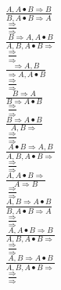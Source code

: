 \documentclass[11pt]{article}
\begin{document}
\begin{center}
\bigskip
\\$\frac{A, A\bullet B\Rightarrow B}{B, A\bullet B\Rightarrow A}$
\bigskip
\\$\frac{\Rightarrow }{\Rightarrow }$
\bigskip
\\$\frac{B\Rightarrow A, A\bullet B}{A, B, A\bullet B\Rightarrow }$
\bigskip
\\$\frac{\Rightarrow }{\Rightarrow }$
\bigskip
\\$\frac{\Rightarrow A, B}{\Rightarrow A, A\bullet B}$
\bigskip
\\$\frac{\Rightarrow }{\Rightarrow }$
\bigskip
\\$\frac{B\Rightarrow A}{B\Rightarrow A\bullet B}$
\bigskip
\\$\frac{\Rightarrow }{\Rightarrow }$
\bigskip
\\$\frac{B\Rightarrow A\bullet B}{A, B\Rightarrow }$
\bigskip
\\$\frac{\Rightarrow }{\Rightarrow }$
\bigskip
\\$\frac{A\bullet B\Rightarrow A, B}{A, B, A\bullet B\Rightarrow }$
\bigskip
\\$\frac{\Rightarrow }{\Rightarrow }$
\bigskip
\\$\frac{A, A\bullet B\Rightarrow }{A\Rightarrow B}$
\bigskip
\\$\frac{\Rightarrow }{\Rightarrow }$
\bigskip
\\$\frac{A, B\Rightarrow A\bullet B}{B, A\bullet B\Rightarrow A}$
\bigskip
\\$\frac{\Rightarrow }{\Rightarrow }$
\bigskip
\\$\frac{A, A\bullet B\Rightarrow B}{A, B, A\bullet B\Rightarrow }$
\bigskip
\\$\frac{\Rightarrow }{\Rightarrow }$
\bigskip
\\$\frac{A, B\Rightarrow A\bullet B}{A, B, A\bullet B\Rightarrow }$
\bigskip
\\$\frac{\Rightarrow }{\Rightarrow }$
\bigskip
\\
\end{center}
\end{document}
